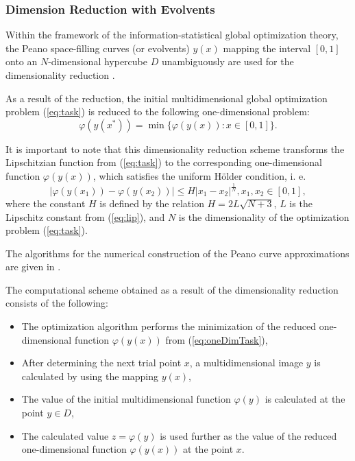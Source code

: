 \documentclass{svproc}
\begin{document}
\subsubsection{Dimension Reduction with Evolvents}
Within the framework of the information-statistical global optimization theory,
the Peano space-filling curves (or evolvents) \(y(x)\) mapping the interval \([0,1]\)
onto an \(N\)-dimensional hypercube \(D\) unambiguously are used for the dimensionality
reduction \cite{sergeyevStronginLera2013, strongin1978, strSergGO}.
\par
As a result of the reduction, the initial multidimensional global optimization
problem (\ref{eq:task}) is reduced to the following one-dimensional problem:
\begin{equation}
\label{eq:oneDimTask}
\varphi(y(x^*))=\min\{\varphi(y(x)):x\in [0,1]\}.
\end{equation}
\par
It is important to note that this dimensionality reduction scheme transforms the %
Lipschitzian function from (\ref{eq:task}) to the corresponding one-dimensional
function \(\varphi(y(x))\), which satisfies the uniform H{\"o}lder condition, i. e.
\begin{equation}
\label{eq:holder}
|\varphi(y(x_1))-\varphi(y(x_2))|\leq H{|x_1-x_2|}^{\frac{1}{N}}, x_1,x_2\in[0,1],
\end{equation}
where the constant $H$ is defined by the relation \(H=2L\sqrt{N+3}\), \(L\) is the Lipschitz
constant from (\ref{eq:lip}), and \(N\) is the dimensionality of the optimization problem
(\ref{eq:task}).
\par
The algorithms for the numerical construction of the Peano curve approximations are
given in \cite{strSergGO}.

\par
The computational scheme obtained as a result of the dimensionality reduction consists of the
following:
\begin{itemize}
  \item The optimization algorithm performs the minimization of the reduced one-dimensional
  function \(\varphi(y(x))\) from (\ref{eq:oneDimTask}),
  \item After determining the next trial point \(x\), a multidimensional image \(y\) is calculated by
using the mapping \(y(x)\),
  \item The value of the initial multidimensional function \(\varphi(y)\) is calculated at the point
\(y\in D\),
  \item The calculated value \(z=\varphi(y)\) is used further as the value of the reduced one-dimensional function \(\varphi(y(x))\) at the point \(x\).
\end{itemize}
\end{document}
